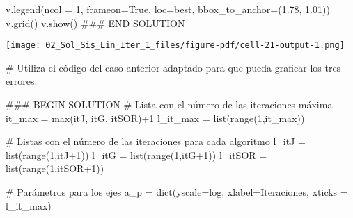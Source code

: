 \documentclass[
  letterpaper,
  DIV=11,
  numbers=noendperiod]{scrreprt}
\newenvironment{Shaded}{\begin{snugshade}}{\end{snugshade}}
\newcommand{\BuiltInTok}[1]{\textcolor[rgb]{0.00,0.23,0.31}{#1}}
\newcommand{\CommentTok}[1]{\textcolor[rgb]{0.37,0.37,0.37}{#1}}
\newcommand{\DecValTok}[1]{\textcolor[rgb]{0.68,0.00,0.00}{#1}}
\newcommand{\FloatTok}[1]{\textcolor[rgb]{0.68,0.00,0.00}{#1}}
\newcommand{\NormalTok}[1]{\textcolor[rgb]{0.00,0.23,0.31}{#1}}
\newcommand{\OperatorTok}[1]{\textcolor[rgb]{0.37,0.37,0.37}{#1}}
\newcommand{\RegionMarkerTok}[1]{\textcolor[rgb]{0.00,0.23,0.31}{#1}}
\newcommand{\StringTok}[1]{\textcolor[rgb]{0.13,0.47,0.30}{#1}}
\newcommand{\VariableTok}[1]{\textcolor[rgb]{0.07,0.07,0.07}{#1}}
\begin{document}
\begin{Shaded}
\begin{Highlighting}[]
\NormalTok{v.legend(ncol }\OperatorTok{=} \DecValTok{1}\NormalTok{, frameon}\OperatorTok{=}\VariableTok{True}\NormalTok{, loc}\OperatorTok{=}\StringTok{\textquotesingle{}best\textquotesingle{}}\NormalTok{, bbox\_to\_anchor}\OperatorTok{=}\NormalTok{(}\FloatTok{1.78}\NormalTok{, }\FloatTok{1.01}\NormalTok{))}
\NormalTok{v.grid()}
\NormalTok{v.show()}
\CommentTok{\#\#\# }\RegionMarkerTok{END}\CommentTok{ SOLUTION}
\end{Highlighting}
\end{Shaded}

\texttt{[image: 02\_Sol\_Sis\_Lin\_Iter\_1\_files/figure-pdf/cell-21-output-1.png]}

\begin{Shaded}
\begin{Highlighting}[]
\CommentTok{\# Utiliza el código del caso anterior adaptado para que pueda graficar los tres errores.}

\CommentTok{\#\#\# }\RegionMarkerTok{BEGIN}\CommentTok{ SOLUTION}
\CommentTok{\# Lista con el número de las iteraciones máxima}
\NormalTok{it\_max }\OperatorTok{=} \BuiltInTok{max}\NormalTok{(itJ, itG, itSOR)}\OperatorTok{+}\DecValTok{1}
\NormalTok{l\_it\_max }\OperatorTok{=} \BuiltInTok{list}\NormalTok{(}\BuiltInTok{range}\NormalTok{(}\DecValTok{1}\NormalTok{,it\_max)) }

\CommentTok{\# Listas con el número de las iteraciones para cada algoritmo}
\NormalTok{l\_itJ }\OperatorTok{=} \BuiltInTok{list}\NormalTok{(}\BuiltInTok{range}\NormalTok{(}\DecValTok{1}\NormalTok{,itJ}\OperatorTok{+}\DecValTok{1}\NormalTok{)) }
\NormalTok{l\_itG }\OperatorTok{=} \BuiltInTok{list}\NormalTok{(}\BuiltInTok{range}\NormalTok{(}\DecValTok{1}\NormalTok{,itG}\OperatorTok{+}\DecValTok{1}\NormalTok{)) }
\NormalTok{l\_itSOR }\OperatorTok{=} \BuiltInTok{list}\NormalTok{(}\BuiltInTok{range}\NormalTok{(}\DecValTok{1}\NormalTok{,itSOR}\OperatorTok{+}\DecValTok{1}\NormalTok{)) }

\CommentTok{\# Parámetros para los ejes}
\NormalTok{a\_p }\OperatorTok{=} \BuiltInTok{dict}\NormalTok{(yscale}\OperatorTok{=}\StringTok{\textquotesingle{}log\textquotesingle{}}\NormalTok{, xlabel}\OperatorTok{=}\StringTok{\textquotesingle{}Iteraciones\textquotesingle{}}\NormalTok{, xticks }\OperatorTok{=}\NormalTok{ l\_it\_max)}


\end{Highlighting}
\end{Shaded}
\end{document}
